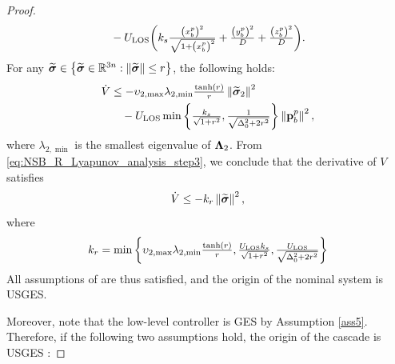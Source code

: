\begin{proof}
\begin{equation}
\begin{split}
                &\quad -U_{\rm LOS} \scale[1]{\left(
                    k_{s}\frac{\left(x_b^p\right)^2}{\sqrt{1 + \left(x_b^p\right)^2}} +
                    \frac{\left(y_b^p\right)^2}{D} +
                    \frac{\left(z_b^p\right)^2}{D}
                  \right)}.
        \end{split}
        \label{eq:NSB_R_Lyapunov_analysis_step2}
    \end{equation}
    For any $\widetilde{\bm{\sigma}} \in \left\{\widetilde{\bm{\sigma}} \in \mathbb{R}^{3n}: \left\|\widetilde{\bm{\sigma}}\right\| \leq r\right\}$, the following holds: 
    \begin{equation}
        \begin{split}
        \dot{V} &\leq  - \upsilon_{2, \max}\lambda_{2, \min}\scale[1]{\frac{{\rm tanh}(r)}{r}}\norm{\widetilde{\bs{\sigma}}_2}^2 \\
                &\quad - U_{\rm LOS}\min\left\{\scale[1]{\frac{k_{s}}{\sqrt{1+r^2}}, \frac{1}{\sqrt{\Delta_0^2+2r^2}}}\right\}\norm{\mat{p}_b^p}^2,
        \end{split}
        \label{eq:NSB_R_Lyapunov_analysis_step3}
    \end{equation}
    where $\lambda_{2, \min}$ is the smallest eigenvalue of $\bm{\Lambda}_2$.
    From \eqref{eq:NSB_R_Lyapunov_analysis_step3}, we conclude that the derivative of $V$ satisfies
    \begin{equation}
        \dot{V} \leq - k_r \left\|\widetilde{\bm{\sigma}}\right\|^2,
    \end{equation}
    where
    \begin{equation}
        k_r = \min \left\{\upsilon_{2, \max}\lambda_{2, \min}\scale[1]{\frac{{\rm tanh}(r)}{r}}, 
                          \scale[1]{\frac{U_{\rm LOS}k_{s}}{\sqrt{1+r^2}}}, 
                          \scale[1]{\frac{U_{\rm LOS}}{\sqrt{\Delta_0^2+2r^2}}}\right\}
    \end{equation}
    All assumptions of \cite[Theorem 5]{pettersen_lyapunov_2017} are thus satisfied, and the origin of the nominal system is USGES.

    

    Moreover, note that the low-level controller is GES by Assumption \ref{ass5}.
    Therefore, if the following two assumptions hold, the origin of the cascade is USGES \cite[Proposition 9]{pettersen_lyapunov_2017}:
    

\end{proof}
